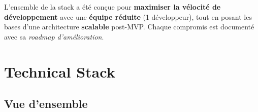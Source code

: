 \documentclass[12pt, a4paper]{article}
\begin{document}
\begin{infobox}
L'ensemble de la stack a été conçue pour \textbf{maximiser la vélocité de développement} avec une \textbf{équipe réduite} (1 développeur), tout en posant les bases d'une architecture \textbf{scalable} post-MVP. Chaque compromis est documenté avec sa \textit{roadmap d'amélioration}.
\end{infobox}

\section{Technical Stack}

\subsection{Vue d'ensemble}
\end{document}
